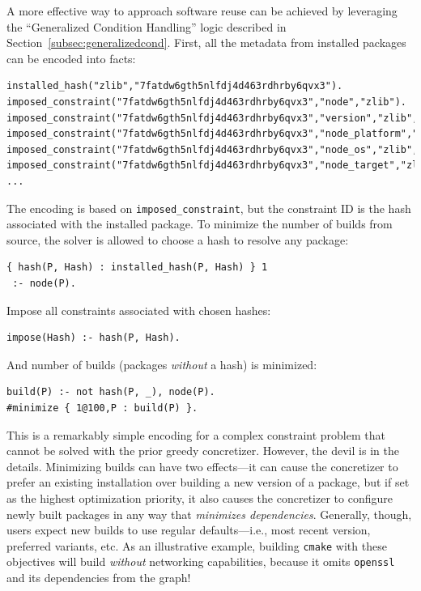 
A more effective way to approach software reuse can be achieved by leveraging the
``Generalized Condition Handling'' logic described in
Section~\ref{subsec:generalizedcond}. First, all the metadata from installed packages
can be encoded into facts:
\begin{verbatim}
installed_hash("zlib","7fatdw6gth5nlfdj4d463rdhrby6qvx3").
imposed_constraint("7fatdw6gth5nlfdj4d463rdhrby6qvx3","node","zlib").
imposed_constraint("7fatdw6gth5nlfdj4d463rdhrby6qvx3","version","zlib","1.2.11").
imposed_constraint("7fatdw6gth5nlfdj4d463rdhrby6qvx3","node_platform","zlib","linux").
imposed_constraint("7fatdw6gth5nlfdj4d463rdhrby6qvx3","node_os","zlib","ubuntu20.04").
imposed_constraint("7fatdw6gth5nlfdj4d463rdhrby6qvx3","node_target","zlib","icelake").
...
\end{verbatim}
The encoding is based on \texttt{imposed\_constraint}, but the constraint ID is the
hash associated with the installed package. To minimize the number of builds from
source, the solver is allowed to choose a hash to resolve any package:
\begin{verbatim}
{ hash(P, Hash) : installed_hash(P, Hash) } 1
 :- node(P).
\end{verbatim}
Impose all constraints associated with chosen hashes:
\begin{verbatim}
impose(Hash) :- hash(P, Hash).
\end{verbatim}
And number of builds (packages \emph{without} a hash) is minimized:
\begin{verbatim}
build(P) :- not hash(P, _), node(P).
#minimize { 1@100,P : build(P) }.
\end{verbatim}

This is a remarkably simple encoding for a complex constraint problem that cannot be
solved with the prior greedy concretizer. However, the devil is in the details.
Minimizing builds can have two effects---it can cause the concretizer to prefer an
existing installation over building a new version of a package, but if set as the
highest optimization priority, it also causes the concretizer to configure newly built
packages in any way that {\it minimizes dependencies}. Generally, though, users expect
new builds to use regular defaults---i.e., most recent version, preferred variants, etc.
As an illustrative example, building \texttt{cmake} with these objectives will build
{\it without} networking capabilities, because it omits \texttt{openssl} and its
dependencies from the graph!

